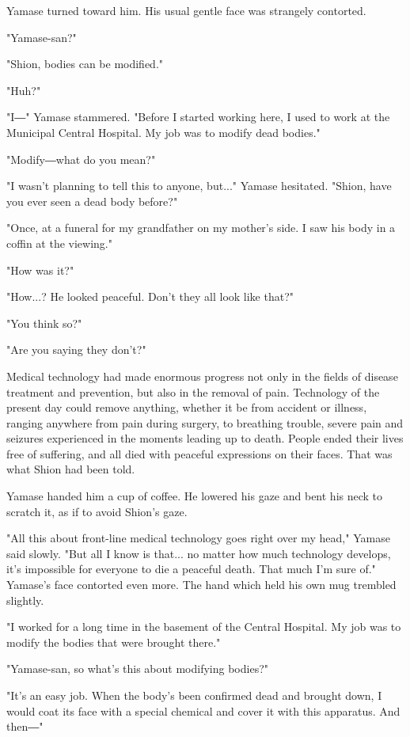 Yamase turned toward him. His usual gentle face was strangely contorted.

"Yamase-san?"

"Shion, bodies can be modified."

"Huh?"

"I―" Yamase stammered. "Before I started working here, I used to work at
the Municipal Central Hospital. My job was to modify dead bodies."

"Modify―what do you mean?"

"I wasn't planning to tell this to anyone, but..." Yamase hesitated.
"Shion, have you ever seen a dead body before?"

"Once, at a funeral for my grandfather on my mother's side. I saw his
body in a coffin at the viewing."

"How was it?"

"How...? He looked peaceful. Don't they all look like that?"

"You think so?"

"Are you saying they don't?"

Medical technology had made enormous progress not only in the fields of
disease treatment and prevention, but also in the removal of pain.
Technology of the present day could remove anything, whether it be from
accident or illness, ranging anywhere from pain during surgery, to
breathing trouble, severe pain and seizures experienced in the moments
leading up to death. People ended their lives free of suffering, and all
died with peaceful expressions on their faces. That was what Shion had
been told.

Yamase handed him a cup of coffee. He lowered his gaze and bent his neck
to scratch it, as if to avoid Shion's gaze.

"All this about front-line medical technology goes right over my head,"
Yamase said slowly. "But all I know is that... no matter how much
technology develops, it's impossible for everyone to die a peaceful
death. That much I'm sure of." Yamase's face contorted even more. The
hand which held his own mug trembled slightly.

"I worked for a long time in the basement of the Central Hospital. My
job was to modify the bodies that were brought there."

"Yamase-san, so what's this about modifying bodies?"

"It's an easy job. When the body's been confirmed dead and brought down,
I would coat its face with a special chemical and cover it with this
apparatus. And then―"

